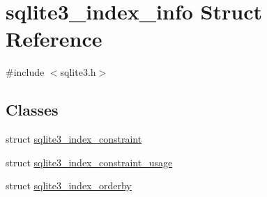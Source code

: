 \hypertarget{structsqlite3__index__info}{}\section{sqlite3\+\_\+index\+\_\+info Struct Reference}
\label{structsqlite3__index__info}


{\ttfamily \#include $<$sqlite3.\+h$>$}

\subsection*{Classes}
\begin{DoxyCompactItemize}
\item 
struct \mbox{\hyperlink{structsqlite3__index__info_1_1sqlite3__index__constraint}{sqlite3\+\_\+index\+\_\+constraint}}
\item 
struct \mbox{\hyperlink{structsqlite3__index__info_1_1sqlite3__index__constraint__usage}{sqlite3\+\_\+index\+\_\+constraint\+\_\+usage}}
\item 
struct \mbox{\hyperlink{structsqlite3__index__info_1_1sqlite3__index__orderby}{sqlite3\+\_\+index\+\_\+orderby}}
\end{DoxyCompactItemize}
